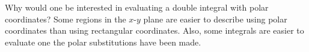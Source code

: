 {Why would one be interested in evaluating a double integral with polar coordinates?
}
{Some regions in the $x$-$y$ plane are easier to describe using polar coordinates than using rectangular coordinates. Also, some integrals are easier to evaluate one the polar substitutions have been made.
}
